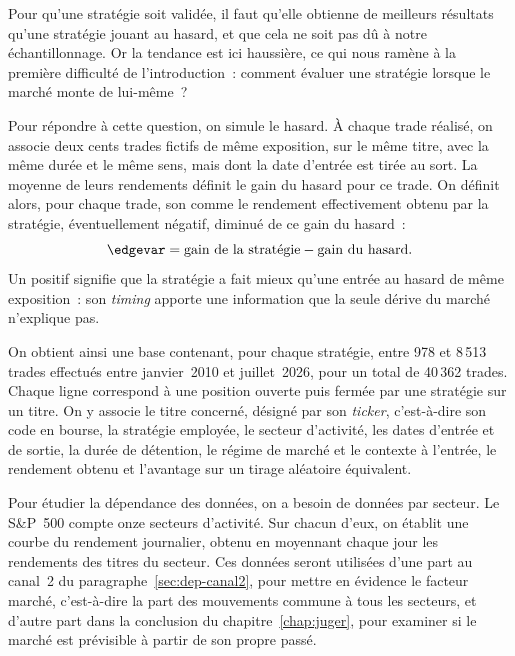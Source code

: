 Pour qu'une stratégie soit validée, il faut qu'elle obtienne de
meilleurs résultats qu'une stratégie jouant au hasard, et que cela ne
soit pas dû à notre échantillonnage. Or la tendance est ici haussière,
ce qui nous ramène à la première difficulté de l'introduction~: comment
évaluer une stratégie lorsque le marché monte de lui-même~?

Pour répondre à cette question, on simule le hasard. À chaque trade
réalisé, on associe deux cents trades fictifs de même exposition, sur le
même titre, avec la même durée et le même sens, mais dont la date
d'entrée est tirée au sort. La moyenne de leurs rendements définit le
gain du hasard pour ce trade. On définit alors, pour chaque trade, son
\edgevar{} comme le rendement effectivement obtenu par la stratégie,
éventuellement négatif, diminué de ce gain du hasard~:
\[
  \edgevar = \text{gain de la stratégie} - \text{gain du hasard}.
\]
Un \edgevar{} positif signifie que la stratégie a fait mieux qu'une
entrée au hasard de même exposition~: son \emph{timing} apporte une
information que la seule dérive du marché n'explique pas.

On obtient ainsi une base contenant, pour chaque stratégie, entre 978 et
8\,513 trades effectués entre janvier~2010 et juillet~2026, pour un
total de 40\,362 trades. Chaque ligne correspond à une position ouverte
puis fermée par une stratégie sur un titre. On y associe le titre
concerné, désigné par son \emph{ticker}, c'est-à-dire son code en
bourse, la stratégie employée, le secteur d'activité, les dates d'entrée
et de sortie, la durée de détention, le régime de marché et le contexte
à l'entrée, le rendement obtenu et l'avantage \edgevar{} sur un tirage
aléatoire équivalent.



Pour étudier la dépendance des données, on a besoin de données par
secteur. Le S\&P~500 compte onze secteurs d'activité. Sur chacun d'eux,
on établit une courbe du rendement journalier, obtenu en moyennant
chaque jour les rendements des titres du secteur. Ces données seront
utilisées d'une part au canal~2 du
paragraphe~\ref{sec:dep-canal2}, pour mettre en évidence le facteur
marché, c'est-à-dire la part des mouvements commune à tous les
secteurs, et d'autre part dans la conclusion du
chapitre~\ref{chap:juger}, pour examiner si le marché est prévisible à
partir de son propre passé.

